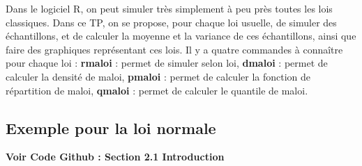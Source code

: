 
Dans le logiciel R, on peut simuler très simplement à peu près toutes les lois classiques. Dans ce TP, on se propose, pour chaque loi usuelle, de simuler des échantillons, et de calculer la moyenne et la variance de ces échantillons, ainsi que faire des graphiques représentant ces lois. Il y a quatre commandes à connaître pour chaque loi : \textbf{rmaloi} : permet de simuler selon loi, \textbf{dmaloi} : permet de calculer la densité de maloi, \textbf{pmaloi} : permet de calculer la fonction de répartition de maloi, \textbf{qmaloi} : permet de calculer le quantile de maloi.


\subsection{Exemple pour la loi normale}

    \textbf{Voir Code Github \cite{git} : Section 2.1 Introduction}

